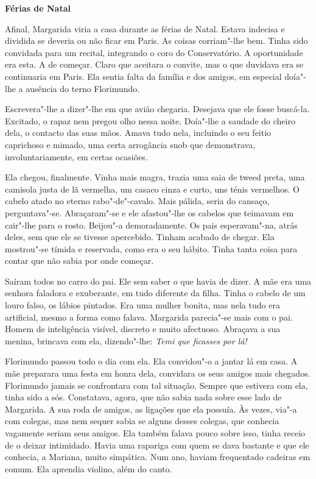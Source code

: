 \vspace*{1.8cm}
\noindent{}\textbf{Férias de Natal}

\bigskip

Afinal, Margarida viria a casa durante as férias de Natal. Estava
indecisa e dividida se deveria ou não ficar em Paris. As coisas
corriam"-lhe bem. Tinha sido convidada para um recital, integrando o coro
do Conservatório. A oportunidade era esta. A de começar. Claro que
aceitara o convite, mas o que duvidava era se continuaria em Paris. Ela
sentia falta da família e dos amigos, em especial doía"-lhe a ausência do
terno Florimundo.

Escrevera"-lhe a dizer"-lhe em que avião chegaria. Desejava que ele fosse
buscá-la. Excitado, o rapaz nem pregou olho nessa noite. Doía"-lhe a
saudade do cheiro dela, o contacto das suas mãos. Amava tudo nela,
incluindo o seu feitio caprichoso e mimado, uma certa arrogância snob
que demonstrava, involuntariamente, em certas ocasiões.

Ela chegou, finalmente. Vinha mais magra, trazia uma saia de tweed
preta, uma camisola justa de lã vermelha, um casaco cinza e curto, uns
ténis vermelhos. O cabelo atado no eterno rabo"-de"-cavalo. Mais pálida,
seria do cansaço, perguntava"-se. Abraçaram"-se e ele afastou"-lhe os
cabelos que teimavam em cair"-lhe para o rosto. Beijou"-a demoradamente.
Os pais esperavam"-na, atrás deles, sem que ele se tivesse apercebido.
Tinham acabado de chegar. Ela mostrou"-se tímida e reservada, como era o
seu hábito. Tinha tanta coisa para contar que não sabia por onde
começar.

Saíram todos no carro do pai. Ele sem saber o que havia de dizer. A mãe
era uma senhora faladora e exuberante, em tudo diferente da filha. Tinha
o cabelo de um louro falso, os lábios pintados. Era uma mulher bonita,
mas nela tudo era artificial, mesmo a forma como falava. Margarida
parecia"-se mais com o pai. Homem de inteligência visível, discreto e
muito afectuoso. Abraçava a sua menina, brincava com ela, dizendo"-lhe:
\emph{Temi que ficasses por lá!}

Florimundo passou todo o dia com ela. Ela convidou"-o a jantar lá em
casa. A mãe preparara uma festa em honra dela, convidara os seus amigos
mais chegados. Florimundo jamais se confrontara com tal situação. Sempre
que estivera com ela, tinha sido a sós. Constatava, agora, que não sabia
nada sobre esse lado de Margarida. A sua roda de amigos, as ligações que
ela possuía. Às vezes, via"-a com colegas, mas nem sequer sabia se alguns
desses colegas, que conhecia vagamente seriam seus amigos. Ela também
falava pouco sobre isso, tinha receio de o deixar intimidado. Havia uma
rapariga com quem se dava bastante e que ele conhecia, a Mariana, muito
simpática. Num ano, haviam frequentado cadeiras em comum. Ela aprendia
violino, além do canto.


